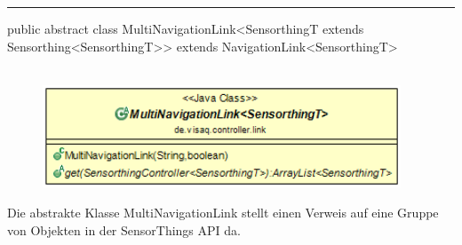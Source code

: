 \rule{\textwidth}{0.4pt}
public abstract class MultiNavigationLink<SensorthingT extends Sensorthing<SensorthingT>> extends NavigationLink<SensorthingT>
\\\\
\begin{minipage}{0.5\textwidth}
    \begin{figure}[H]
        {\centering\includegraphics[width=0.95\textwidth]{media/backend/controller/classes/MultiNavigationLink.png}}
    \end{figure}
    \end{minipage} \hfill
\begin{minipage}{0.5\textwidth}
    Die abstrakte Klasse MultiNavigationLink stellt einen Verweis auf eine Gruppe von Objekten in der \gls{SensorThings API} da.
\end{minipage}

